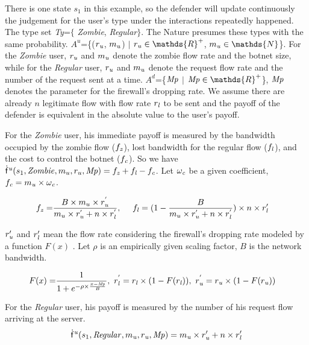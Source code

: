 \documentclass[10pt, conference, compsocconf]{IEEEtran}
\begin{document}
There is one state $s_1$ in this example, so the defender will update continuously the judgement for the user's type under the  interactions repeatedly happened.
The type set {\it Ty}=$\{$ {\it Zombie}, {\it Regular}$\}$.
The Nature presumes these types with the same probability.
$A^u$=\{($r_{\it u}$, $m_{\it u}$) $\mid$ $r_{\it u}\in \mathds{R}^+$, $m_{\it u}\in \mathds{N}$\}.
For the {\it Zombie} user, $r_{\it u}$ and $m_{\it u}$ denote the zombie flow rate and the botnet size, while for the {\it Regular} user, $r_{\it u}$ and $m_{\it u}$ denote the request flow rate and the number of the request sent at a time.
$A^d$=\{${\it Mp}$ $\mid$ ${\it Mp}\in \mathds{R}^+$\}, ${\it Mp}$ denotes the parameter for the firewall's dropping rate.
We assume there are already $n$ legitimate flow with flow rate $r_{\it l}$ to be sent and the payoff of the defender is equivalent in the absolute value to the user's payoff.

For the \textit{Zombie} user, his immediate payoff is measured by the bandwidth occupied by the zombie flow ($f_{\it z}$), lost bandwidth  for the regular flow ($f_{\it l}$), and the cost to control the botnet ($f_{\it c}$). So we have ${\sf \dot{f}}^{\it u}(s_1,{\it Zombie}, m_{u},r_{u},{\it Mp})= f_{\it z}+f_{\it l}-f_{\it c}$. Let $\omega_{\it c}$ be a given coefficient, $f_{\it c}=m_{\it u}\times \omega_{\it c}$.

\begin{footnotesize}
\begin{align*}
f_{\it z}=& \frac{B\times m_{u}\times r_{\it u}^{'}}{m_{u}\times r_{\it u}^{'}+n\times r_{\it l}^{'}},~~~~
f_{\it l}= (1-\frac{B}{m_{u}\times r_{\it u}^{'}+n\times r_{\it l}^{'}})\times n\times r_{\it l}'
\end{align*}
\end{footnotesize}
$r_{\it u}'$ and $r_{\it l}'$ mean the flow rate considering the firewall's dropping rate modeled by a function $F(x)$ \cite{harkeerat}. Let $\rho$ is an empirically given scaling factor, $B$ is the network bandwidth.
\begin{footnotesize}
\begin{align*}
F(x)=&\frac{1}{1+e^{-\rho\times \frac{x-{\it Mp}}{B}}},~r_{\it l}^{'}=r_{\it l}\times (1-F(r_{\it l})),~
r_{\it u}^{'}=r_{\it u}\times (1-F(r_{\it u}))
\end{align*}
\end{footnotesize}

For the \textit{Regular} user, his payoff is measured by the number of his request flow arriving at the server.
$${\sf \dot{f}}^{\it u}(s_1, {\it Regular}, m_{\it u}, r_{\it u},{\it Mp})= m_{\it u}\times r_{\it u}' + n\times r_{\it l}'$$
\end{document}
